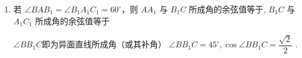 \begin{enumerate}
\begin{enumerate}
\begin{jieda}
            ${AB} \bot  {CD}$ ,故 $C{D}_{1}$ 与 ${AB}$ 所成角为 $\angle {D}_{1}{CD} = \arctan \dfrac{{D}_{1}D}{CD} = \arctan \dfrac{1}{\sqrt{3}} = {30}^{ \circ  }$
            
            易证四边形 ${A}_{1}{B}_{1}{CD}$ 是平行四边形,故 ${A}_{1}D\bot {B}_{1}C$，不难求得 ${B}_{1}C = \sqrt{2},{D}_{1}C = {D}_{1}{B}_{1} = 2,C{D}_{1}$ 与 ${A}_{1}D$ 所成角为 $\angle {D}_{1}C{B}_{1},\cos \angle {D}_{1}C{B}_{1} = \dfrac{C{D}_{1}^{2} + C{B}_{1}^{2} - {B}_{1}{D}_{1}^{2}}{2 \cdot  C{D}_{1} \cdot  C{B}_{1}} = \dfrac{\sqrt{2}}{4}$ ,故 $\sin \angle {D}_{1}{CD} = \dfrac{\sqrt{14}}{4}.$
        \end{jieda}
        \item 若 $\angle {BA}{B}_{1} = \angle {B}_{1}{A}_{1}{C}_{1} = {60}^{ \circ  }$，则 $A{A}_{1}$ 与 ${B}_{1}C$ 所成角的余弦值等于, ${B}_{1}C$ 与 ${A}_{1}{C}_{1}$ 所成角的余弦值等于
        \begin{jieda}
            $\angle{BB_1C}$即为异面直线所成角（或其补角） $\angle B{B}_{1}C = {45}^{ \circ  },\cos \angle B{B}_{1}C = \dfrac{\sqrt{2}}{2}$ .
            

\end{jieda}
\end{enumerate}
\end{enumerate}
